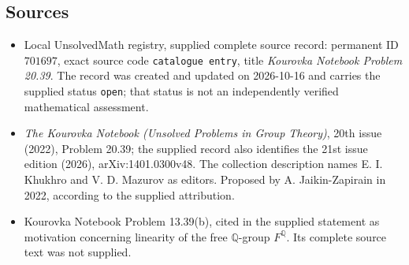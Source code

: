\documentclass[11pt]{article}
\newcommand{\Q}{\mathbb{Q}}
\begin{document}
\subsection{Sources}
\begin{itemize}
\item Local UnsolvedMath registry, supplied complete source record: permanent ID \(701697\), exact source code \texttt{catalogue entry}, title \emph{Kourovka Notebook Problem 20.39}. The record was created and updated on 2026-10-16 and carries the supplied status \texttt{open}; that status is not an independently verified mathematical assessment.
\item \emph{The Kourovka Notebook (Unsolved Problems in Group Theory)}, 20th issue (2022), Problem 20.39; the supplied record also identifies the 21st issue edition (2026), arXiv:1401.0300v48. The collection description names E. I. Khukhro and V. D. Mazurov as editors. Proposed by A. Jaikin-Zapirain in 2022, according to the supplied attribution.
\item Kourovka Notebook Problem 13.39(b), cited in the supplied statement as motivation concerning linearity of the free \(\Q\)-group \(F^{\Q}\). Its complete source text was not supplied.
\end{itemize}
\end{document}
